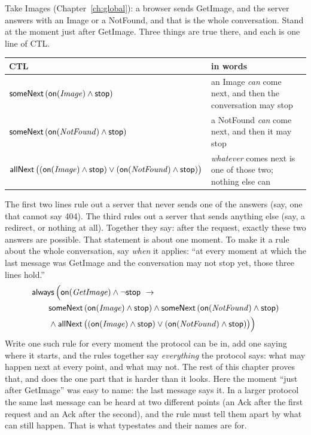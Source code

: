 Take Images (Chapter~\ref{ch:global}): a browser sends GetImage, and the server answers
with an Image or a NotFound, and that is the whole conversation. Stand at the moment
just after GetImage. Three things are true there, and each is one line of CTL.

\begin{center}
\begin{tabular}{@{}lp{}@{}}
\toprule
CTL & in words \\
\midrule
$\mathsf{someNext}\,(\mathsf{on}(\mathit{Image})\wedge\mathsf{stop})$ & an Image \emph{can} come next, and then the conversation may stop \\
$\mathsf{someNext}\,(\mathsf{on}(\mathit{NotFound})\wedge\mathsf{stop})$ & a NotFound \emph{can} come next, and then it may stop \\
$\mathsf{allNext}\,\big((\mathsf{on}(\mathit{Image})\wedge\mathsf{stop})\vee(\mathsf{on}(\mathit{NotFound})\wedge\mathsf{stop})\big)$ & \emph{whatever} comes next is one of those two; nothing else can \\
\bottomrule
\end{tabular}
\end{center}

The first two lines rule out a server that never sends one of the answers (say, one
that cannot say 404). The third rules out a server that sends anything else (say, a
redirect, or nothing at all). Together they say: after the request, exactly these two
answers are possible.
That statement is about one moment. To make it a rule about the whole conversation,
say \emph{when} it applies: ``at every moment at which the last message was GetImage
and the conversation may not stop yet, those three lines hold.''
\begin{align*}
&\mathsf{always}\,\Big(\mathsf{on}(\mathit{GetImage})\wedge\neg\mathsf{stop}\ \rightarrow\\
&\qquad\mathsf{someNext}\,(\mathsf{on}(\mathit{Image})\wedge\mathsf{stop})\wedge\mathsf{someNext}\,(\mathsf{on}(\mathit{NotFound})\wedge\mathsf{stop})\\
&\qquad{}\wedge\mathsf{allNext}\,\big((\mathsf{on}(\mathit{Image})\wedge\mathsf{stop})\vee(\mathsf{on}(\mathit{NotFound})\wedge\mathsf{stop})\big)\Big)
\end{align*}
Write one such rule for every moment the protocol can be in, add one saying where it
starts, and the rules together say \emph{everything} the protocol says: what may happen
next at every point, and what may not. The rest of this chapter proves that, and does
the one part that is harder than it looks. Here the moment ``just after GetImage'' was
easy to name: the last message says it. In a larger protocol the same last message can
be heard at two different points (an Ack after the first request and an Ack after the
second), and the rule must tell them apart by what can still happen. That is what
typestates and their names are for.

